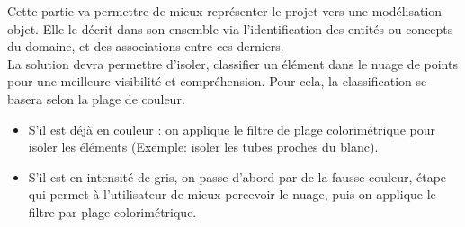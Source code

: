 \documentclass[12pt,titlepage,french]{article}
\begin{document}
Cette partie va permettre de mieux représenter le projet vers une modélisation objet. Elle le décrit dans son ensemble via l'identification des entités ou concepts du domaine, et des associations entre ces derniers. \\

La solution devra permettre d’isoler, classifier un élément dans le nuage de points pour une meilleure visibilité et compréhension. Pour cela, la classification se basera selon la plage de couleur.\\

\begin{itemize}
        \item  S'il est déjà en couleur : on applique le filtre de plage colorimétrique pour isoler les éléments (Exemple: isoler les tubes proches du blanc).\par

        \item  S'il est en intensité de gris, on passe d'abord par de la fausse couleur, étape qui permet à l'utilisateur de mieux percevoir le nuage, puis on applique le filtre par plage colorimétrique.\\ \par
\end{itemize}
\end{document}
